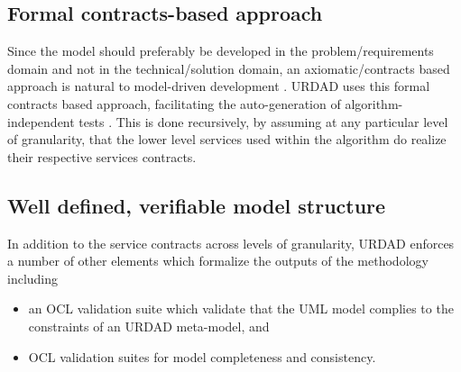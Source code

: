 


\subsection{Formal contracts-based approach}

Since the model should preferably be developed in the problem/requirements domain and not in the
technical/solution domain, an axiomatic/contracts based approach is natural to 
model-driven development
\cite{Briand:investigationOfFormalityInUmlBaedDevelopment}. URDAD uses this formal contracts based approach, facilitating
the auto-generation of algorithm-independent tests
\cite{meyer:programsThatTestThemselves}. 
This is done recursively,
by assuming at any particular level of granularity, that the lower level services used within
the algorithm do realize their respective services contracts.



\subsection{Well defined, verifiable model structure}

In addition to the service contracts across levels of granularity, URDAD enforces a number
of other elements which formalize the outputs of the methodology including
\begin{itemize}
  \item an OCL validation suite which validate that the UML model complies to the
			constraints of an URDAD meta-model, and
  \item OCL validation suites for model completeness and consistency.
\end{itemize}

